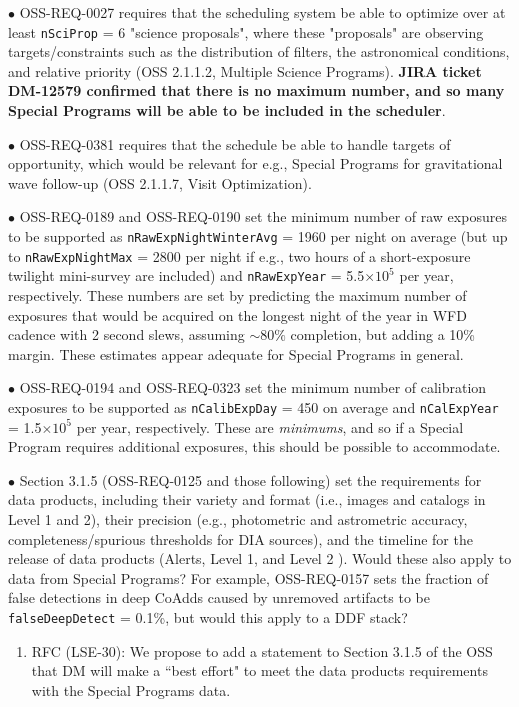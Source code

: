 $\bullet$ OSS-REQ-0027 requires that the scheduling system be able to optimize over at least \texttt{nSciProp} = 6 "science proposals", where these "proposals" are observing targets/constraints such as the distribution of filters, the astronomical conditions, and relative priority (OSS 2.1.1.2, Multiple Science Programs). {\bf JIRA ticket DM-12579 confirmed that there is no maximum number, and so many Special Programs will be able to be included in the scheduler}.

$\bullet$ OSS-REQ-0381 requires that the schedule be able to handle targets of opportunity, which would be relevant for e.g., Special Programs for gravitational wave follow-up (OSS 2.1.1.7, Visit Optimization).

$\bullet$ OSS-REQ-0189 and OSS-REQ-0190 set the minimum number of raw exposures to be supported as \texttt{nRawExpNightWinterAvg} = 1960 per night on average (but up to \texttt{nRawExpNightMax} = 2800 per night if e.g., two hours of a short-exposure twilight mini-survey are included) and \texttt{nRawExpYear} = 5.5$\times10^5$ per year, respectively. These numbers are set by predicting the maximum number of exposures that would be acquired on the longest night of the year in WFD cadence with 2 second slews, assuming $\sim80\%$ completion, but adding a 10\% margin. These estimates appear adequate for Special Programs in general.

$\bullet$ OSS-REQ-0194 and OSS-REQ-0323 set the minimum number of calibration exposures to be supported as \texttt{nCalibExpDay} = 450 on average and \texttt{nCalExpYear} = 1.5$\times10^5$ per year, respectively. These are \textit{minimums}, and so if a Special Program requires additional exposures, this should be possible to accommodate.

$\bullet$ Section 3.1.5 (OSS-REQ-0125 and those following) set the requirements for data products, including their variety and format (i.e., images and catalogs in Level 1 and 2), their precision (e.g., photometric and astrometric accuracy, completeness/spurious thresholds for DIA sources), and the timeline for the release of data products (Alerts, Level 1, and Level 2 ). Would these also apply to data from Special Programs? For example, OSS-REQ-0157 sets the fraction of false detections in deep CoAdds caused by unremoved artifacts to be \texttt{falseDeepDetect} = 0.1\%, but would this apply to a DDF stack?
\begin{enumerate}[resume,topsep=-10pt,after=\vspace{10pt},label= \textbf{Action \Roman*}] \item \label{OSS-3} RFC (LSE-30): We propose to add a statement to Section 3.1.5 of the OSS that DM will make a ``best effort" to meet the data products requirements with the Special Programs data. \end{enumerate}

